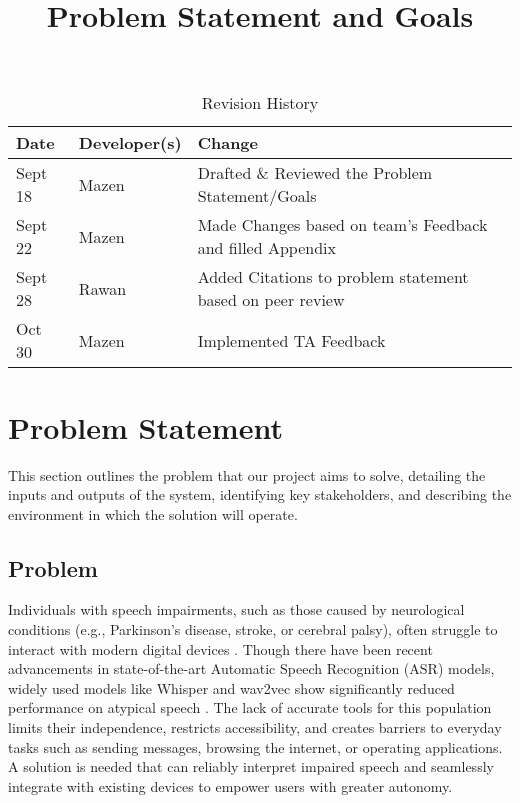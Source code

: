 \documentclass{article}
\title{Problem Statement and Goals\\\progname}
\author{\authname}
\date{}
\begin{document}
\maketitle

\begin{table}[hp]
\caption{Revision History} \label{TblRevisionHistory}
\begin{tabularx}{\textwidth}{llX}
\toprule
\textbf{Date} & \textbf{Developer(s)} & \textbf{Change}\\
\midrule
Sept 18 & Mazen & Drafted \& Reviewed the Problem Statement/Goals\\
Sept 22 & Mazen & Made Changes based on team's Feedback and filled Appendix\\
Sept 28 & Rawan & Added Citations to problem statement based on peer review\\
Oct 30 & Mazen & Implemented TA Feedback\\
\bottomrule
\end{tabularx}
\end{table}

\section{Problem Statement}
This section outlines the problem that our project aims to solve, detailing the inputs and outputs of the system, identifying key stakeholders, and describing the environment in which the solution will operate.
\subsection{Problem}
Individuals with speech impairments, such as those caused by neurological conditions (e.g., Parkinson's disease, stroke, or cerebral palsy), often struggle to interact with modern digital devices \cite{nidcd2024assistive}. Though there have been recent advancements in state-of-the-art Automatic Speech Recognition (ASR) models, widely used models like Whisper and wav2vec show significantly reduced performance on atypical speech \cite{pokel2025variational}. The lack of accurate tools for this population limits their independence, restricts accessibility, and creates barriers to everyday tasks such as sending messages, browsing the internet, or operating applications. A solution is needed that can reliably interpret impaired speech and seamlessly integrate with existing devices to empower users with greater autonomy.
\end{document}
